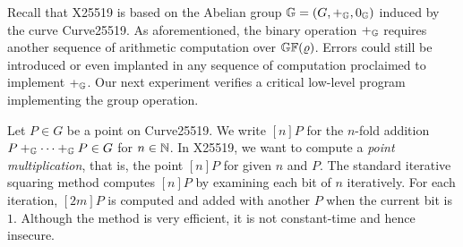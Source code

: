 
Recall that X25519 is based on the Abelian group $\mathbb{G} = (G, +_{\mathbb{G}},
0_{\mathbb{G}})$ induced by the curve Curve25519. As aforementioned, the binary
operation $+_{\mathbb{G}}$ requires another sequence of arithmetic computation
over $\mathbb{GF}(\varrho)$. Errors could still be introduced or even
implanted in any sequence of computation proclaimed to implement $+_{\mathbb{G}}$.
Our next experiment verifies a critical low-level program implementing
the group operation.

Let $P \in G$ be a point on Curve25519. We write $[n]P$ for the
$n$-fold addition ${P +_{\mathbb{G}} \cdots +_{\mathbb{G}} P} \in G$ for $n \in \mathbb{N}$.
In X25519, we want to compute a \emph{point multiplication}, that is,
the point $[n]P$ for given $n$ and $P$. The standard iterative
squaring method computes $[n]P$ by examining each bit of $n$ iteratively.
For each iteration, $[2m]P$ is computed and
added with another $P$ when the current bit is $1$. Although the
method is very efficient, it is not constant-time and hence insecure. 


